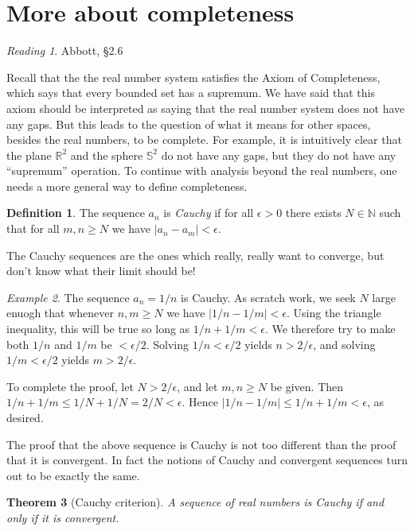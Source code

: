 \documentclass[11pt,oneside]{amsbook}
\newcommand{\N}{\mathbb N}
\newcommand{\R}{\mathbb R}
\theoremstyle{definition}
\theoremstyle{plain}
\newtheorem{theorem}{Theorem}[section]
\theoremstyle{definition}
\newtheorem{definition}[theorem]{Definition}
\theoremstyle{remark}
\newtheorem{example}[theorem]{Example}
\newtheorem*{reading}{Reading}
\numberwithin{equation}{section}
\numberwithin{figure}{section}
\begin{document}
\newpage
\section{More about completeness}

\begin{reading}
  Abbott, \S 2.6
\end{reading}

Recall that the the real number system satisfies the Axiom of Completeness, which says that every bounded set has a supremum. We have said that this axiom should be interpreted as saying that the real number system does not have any gaps. But this leads to the question of what it means for other spaces, besides the real numbers, to be complete. For example, it is intuitively clear that the plane $\R^2$ and the sphere $\mathbb S^2$ do not have any gaps, but they do not have any ``supremum'' operation. To continue with analysis beyond the real numbers, one needs a more general way to define completeness.

\begin{definition}
  The sequence $a_n$ is \emph{Cauchy} if for all $\epsilon>0$ there exists $N\in\N$ such that for all $m,n\geq N$ we have $|a_n-a_m|<\epsilon$.
\end{definition}

The Cauchy sequences are the ones which really, really want to converge, but don't know what their limit should be!

\begin{example}
  The sequence $a_n=1/n$ is Cauchy. As scratch work, we seek $N$ large enuogh that whenever $n,m\geq N$ we have $|1/n-1/m|<\epsilon$. Using the triangle inequality, this will be true so long as $1/n+1/m<\epsilon$. We therefore try to make both $1/n$ and $1/m$ be $<\epsilon/2$. Solving $1/n<\epsilon/2$ yields $n>2/\epsilon$, and solving $1/m<\epsilon/2$ yields $m>2/\epsilon$. 
  
  To complete the proof, let $N>2/\epsilon$, and let $m,n\geq N$ be given. Then $1/n+1/m\leq1/N+1/N=2/N<\epsilon$. Hence $|1/n-1/m|\leq1/n+1/m<\epsilon$, as desired.
\end{example}

The proof that the above sequence is Cauchy is not too different than the proof that it is convergent. In fact the notions of Cauchy and convergent sequences turn out to be exactly the same.

\begin{theorem}[Cauchy criterion]
  A sequence of real numbers is Cauchy if and only if it is convergent.
\end{theorem}
\end{document}
